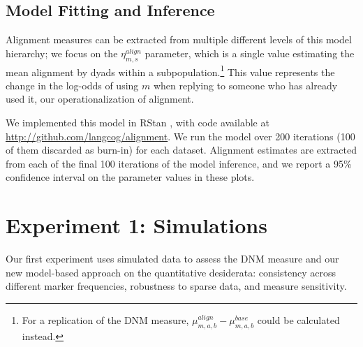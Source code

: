 \documentclass{acm_proc_article-sp}
\begin{document}
\subsection{Model Fitting and Inference}
Alignment measures can be extracted from multiple different levels of this model hierarchy; we focus on the $\eta^{align}_{m,s}$ parameter, which is a single value estimating the mean alignment by dyads within a subpopulation.\footnote{For a replication of the DNM measure, $\mu^{align}_{m,a,b}-\mu^{base}_{m,a,b}$ could be calculated instead.}  This value represents the change in the log-odds of using $m$ when replying to someone who has already used it, our operationalization of alignment.

We implemented this model in RStan \cite{Stan}, with code available at \url{http://github.com/langcog/alignment}. We run the model over 200 iterations (100 of them discarded as burn-in) for each dataset.  Alignment estimates are extracted from each of the final 100 iterations of the model inference, and we report a 95\% confidence interval on the parameter values in these plots.



\section{Experiment 1: Simulations}
Our first experiment uses simulated data to assess the DNM measure and our new model-based approach on the quantitative desiderata: consistency across different marker frequencies, robustness to sparse data, and measure sensitivity.
\end{document}
